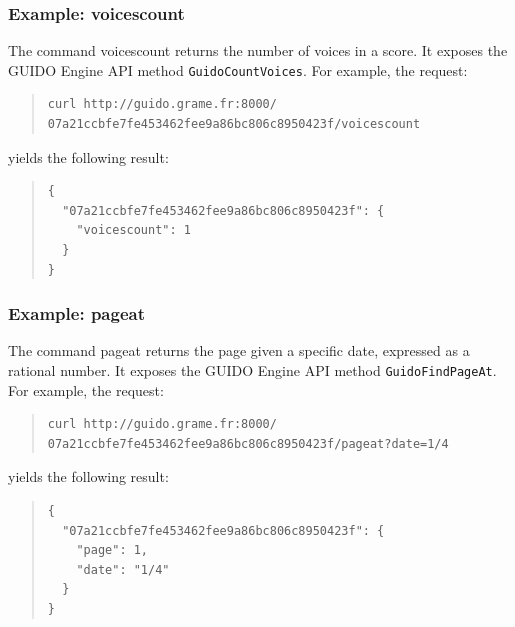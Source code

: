 \documentclass{article}
\newcommand{\guidosize}{6pt}
\begin{document}
\subsubsection{Example: voicescount}
The command voicescount returns the number of voices in a score.  It exposes the GUIDO Engine API method \verb=GuidoCountVoices=.  For example, the request:
\begin{quote}
\begingroup
\fontsize{\guidosize}{12pt}\selectfont
\begin{verbatim}
curl http://guido.grame.fr:8000/
07a21ccbfe7fe453462fee9a86bc806c8950423f/voicescount
\end{verbatim}
\endgroup
\end{quote}
yields the following result:
\begin{quote}
\begingroup
\fontsize{\guidosize}{12pt}\selectfont
\begin{verbatim}
{
  "07a21ccbfe7fe453462fee9a86bc806c8950423f": {
    "voicescount": 1
  }
}
\end{verbatim}
\endgroup
\end{quote}


\subsubsection{Example: pageat}
The command pageat returns the page given a specific date, expressed as a rational number.  It exposes the GUIDO Engine API method \verb=GuidoFindPageAt=.  For example, the request:
\begin{quote}
\begingroup
\fontsize{\guidosize}{12pt}\selectfont
\begin{verbatim}
curl http://guido.grame.fr:8000/
07a21ccbfe7fe453462fee9a86bc806c8950423f/pageat?date=1/4
\end{verbatim}
\endgroup
\end{quote}
yields the following result:
\begin{quote}
\begingroup
\fontsize{\guidosize}{12pt}\selectfont
\begin{verbatim}
{
  "07a21ccbfe7fe453462fee9a86bc806c8950423f": {
    "page": 1,
    "date": "1/4"
  }
}
\end{verbatim}
\endgroup
\end{quote}
\end{document}
